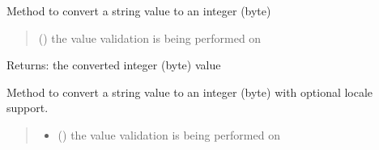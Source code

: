 \documentclass[letterpaper,10pt,english]{sphinxmanual}
\begin{document}
\begin{fulllineitems}
\begin{fulllineitems}
\label{\detokenize{apache_commons_validator_python:apache_commons_validator_python.generic_type_validator_new.GenericTypeValidator.format_byte}}
\pysigstartsignatures
{}
\pysigstopsignatures
\sphinxAtStartPar
Method to convert a string value to an integer (byte)
\begin{quote}\begin{description}
\sphinxAtStartPar
{} () \textendash{} the value validation is being performed on

\end{description}\end{quote}

\sphinxAtStartPar
Returns: the converted integer (byte) value

\end{fulllineitems}


\begin{fulllineitems}
\label{\detokenize{apache_commons_validator_python:apache_commons_validator_python.generic_type_validator_new.GenericTypeValidator.format_byte_locale}}
\pysigstartsignatures
{}
\pysigstopsignatures
\sphinxAtStartPar
Method to convert a string value to an integer (byte) with optional locale
support.
\begin{quote}\begin{description}
\begin{itemize}
\item {} 
\sphinxAtStartPar
{} () \textendash{} the value validation is being performed on


\end{itemize}
\end{description}
\end{quote}
\end{fulllineitems}
\end{fulllineitems}
\end{document}
